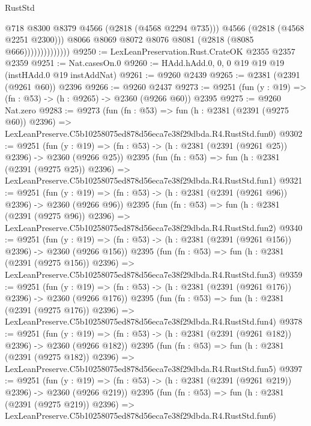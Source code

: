 \begin{lexlean}{RustStd}
\begin{coremodule}
                                @718
                                @8300
                                @8379
                                @4566
                                (@2818 (@4568 @2294 @735)))
                              @4566
                              (@2818 (@4568 @2251 @2300)))
                            @8066
                            @8069
                            @8072
                            @8076
                            @8081
                            (@2818 (@8085 @666))))))))))))))
@9250 := LexLeanPreservation.Rust.CrateOK @2355 @2357 @2359
@9251 := Nat.casesOn.{0}
@9260 := HAdd.hAdd.{0, 0, 0} @19 @19 @19 (instHAdd.{0} @19 instAddNat)
@9261 := @9260 @2439
@9265 := @2381 (@2391 (@9261 @60)) @2396
@9266 := @9260 @2437
@9273 := @9251 (fun (y : @19) => (fn : @53) -> (h : @9265) -> @2360 (@9266 @60)) @2395
@9275 := @9260 Nat.zero
@9283 := @9273
    (fun (fn : @53) =>
    fun (h : @2381 (@2391 (@9275 @60)) @2396) =>
    LexLeanPreserve.C5b10258075ed878d56eca7e38f29dbda.R4.RustStd.fun0)
@9302 := @9251
    (fun (y : @19) => (fn : @53) -> (h : @2381 (@2391 (@9261 @25)) @2396) -> @2360 (@9266 @25))
    @2395
    (fun (fn : @53) =>
    fun (h : @2381 (@2391 (@9275 @25)) @2396) =>
    LexLeanPreserve.C5b10258075ed878d56eca7e38f29dbda.R4.RustStd.fun1)
@9321 := @9251
    (fun (y : @19) => (fn : @53) -> (h : @2381 (@2391 (@9261 @96)) @2396) -> @2360 (@9266 @96))
    @2395
    (fun (fn : @53) =>
    fun (h : @2381 (@2391 (@9275 @96)) @2396) =>
    LexLeanPreserve.C5b10258075ed878d56eca7e38f29dbda.R4.RustStd.fun2)
@9340 := @9251
    (fun (y : @19) => (fn : @53) -> (h : @2381 (@2391 (@9261 @156)) @2396) -> @2360 (@9266 @156))
    @2395
    (fun (fn : @53) =>
    fun (h : @2381 (@2391 (@9275 @156)) @2396) =>
    LexLeanPreserve.C5b10258075ed878d56eca7e38f29dbda.R4.RustStd.fun3)
@9359 := @9251
    (fun (y : @19) => (fn : @53) -> (h : @2381 (@2391 (@9261 @176)) @2396) -> @2360 (@9266 @176))
    @2395
    (fun (fn : @53) =>
    fun (h : @2381 (@2391 (@9275 @176)) @2396) =>
    LexLeanPreserve.C5b10258075ed878d56eca7e38f29dbda.R4.RustStd.fun4)
@9378 := @9251
    (fun (y : @19) => (fn : @53) -> (h : @2381 (@2391 (@9261 @182)) @2396) -> @2360 (@9266 @182))
    @2395
    (fun (fn : @53) =>
    fun (h : @2381 (@2391 (@9275 @182)) @2396) =>
    LexLeanPreserve.C5b10258075ed878d56eca7e38f29dbda.R4.RustStd.fun5)
@9397 := @9251
    (fun (y : @19) => (fn : @53) -> (h : @2381 (@2391 (@9261 @219)) @2396) -> @2360 (@9266 @219))
    @2395
    (fun (fn : @53) =>
    fun (h : @2381 (@2391 (@9275 @219)) @2396) =>
    LexLeanPreserve.C5b10258075ed878d56eca7e38f29dbda.R4.RustStd.fun6)

\end{coremodule}
\end{lexlean}

